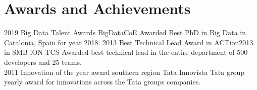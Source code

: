 \documentclass[]{friggeri-cv}
\begin{document}
	\section{Awards and Achievements}
	\begin{entrylist}
		\entry
		{2019}
		{Big Data Talent Awards}
		{BigDataCoE}
		{Awarded Best PhD in Big Data in Catalonia, Spain for year 2018.}
		 \entry
		{2013}
		{Best Technical Lead Award in ACTion2013 in SMB iON}
		{TCS}
		{Awarded best technical lead in the entire department of 500 developers and 25 teams.\\}
		\entry
		{2011}
		{Innovation of the year award southern region}
		{Tata Innovista}
		{Tata group yearly award for innovations across the Tata groups  companies.\\}
	\end{entrylist}
	
	


	
	
\end{document}
